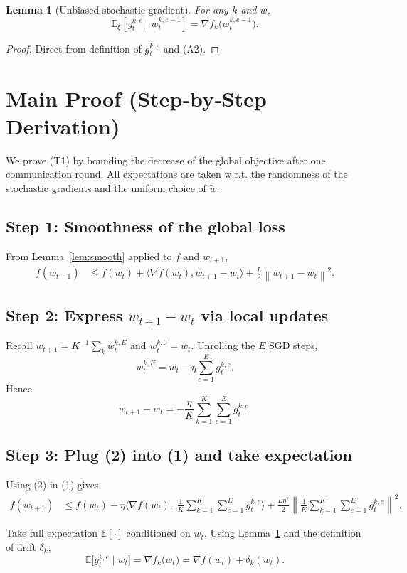 \documentclass{article}
\newtheorem{lemma}{Lemma}
\newcommand{\EE}{\mathbb{E}}
\newcommand{\norm}[1]{\left\lVert#1\right\rVert}
\newcommand{\inner}[2]{\langle #1,#2\rangle}
\begin{document}
\begin{lemma}[Unbiased stochastic gradient]\label{lem:unbiased}
For any $k$ and $w$,
\[
\EE_{\xi}[g_{t}^{k,e}\mid w_{t}^{k,e-1}]=\nabla f_k\!\bigl(w_{t}^{k,e-1}\bigr).
\]
\end{lemma}
\begin{proof}
Direct from definition of $g_{t}^{k,e}$ and (A2). \qedhere
\end{proof}

\section*{Main Proof (Step‑by‑Step Derivation)}
We prove (T1) by bounding the decrease of the global objective after one communication round.
All expectations are taken w.r.t. the randomness of the stochastic gradients and the uniform choice of $\widetilde w$.

\subsection*{Step 1: Smoothness of the global loss}
From Lemma~\ref{lem:smooth} applied to $f$ and $w_{t+1}$,
\[
\begin{aligned}
f(w_{t+1})
&\le f(w_t)+\inner{\nabla f(w_t)}{w_{t+1}-w_t}
+\frac{L}{2}\norm{w_{t+1}-w_t}^2 .
\tag{1}
\end{aligned}
\]

\subsection*{Step 2: Express $w_{t+1}-w_t$ via local updates}
Recall $w_{t+1}=K^{-1}\sum_{k}w_{t}^{k,E}$ and $w_{t}^{k,0}=w_t$. Unrolling the $E$ SGD steps,
\[
w_{t}^{k,E}=w_t-\eta\sum_{e=1}^{E} g_{t}^{k,e}.
\]
Hence
\[
w_{t+1}-w_t
=-\frac{\eta}{K}\sum_{k=1}^{K}\sum_{e=1}^{E} g_{t}^{k,e}.
\tag{2}
\]

\subsection*{Step 3: Plug (2) into (1) and take expectation}
Using (2) in (1) gives
\[
\begin{aligned}
f(w_{t+1})
&\le f(w_t)
-\eta\Big\langle \nabla f(w_t),\;
\frac1K\sum_{k=1}^{K}\sum_{e=1}^{E} g_{t}^{k,e}\Big\rangle
+\frac{L\eta^{2}}{2}\norm{\frac1K\sum_{k=1}^{K}\sum_{e=1}^{E} g_{t}^{k,e}}^{2}.
\tag{3}
\end{aligned}
\]

Take full expectation $\EE[\cdot]$ conditioned on $w_t$.
Using Lemma~\ref{lem:unbiased} and the definition of drift $\delta_k$,
\[
\EE\!\bigl[g_{t}^{k,e}\mid w_t\bigr]
= \nabla f_k\!\bigl(w_t\bigr)
= \nabla f(w_t)+\delta_k(w_t).
\tag{4}
\]
\end{document}
